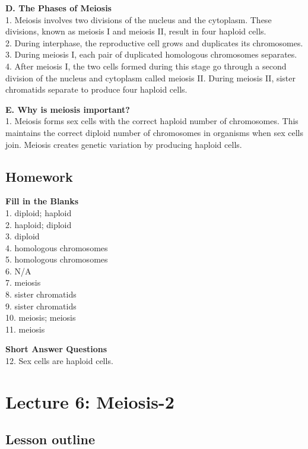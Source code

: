 \documentclass[
]{book}
\begin{document}
\textbf{D. The Phases of Meiosis}\\
1. Meiosis involves two divisions of the nucleus and the {cytoplasm}. These divisions, known as meiosis I and meiosis II, result in four haploid cells.\\
2. During {interphase}, the reproductive cell grows and duplicates its chromosomes.\\
3. During meiosis I, each pair of duplicated homologous chromosomes {separates}.\\
4. After meiosis I, the two cells formed during this stage go through a second division of the {nucleus} and cytoplasm called meiosis II. During meiosis II, sister {chromatids} separate to produce four haploid cells.

\textbf{E. Why is meiosis important?}\\
1. Meiosis forms sex cells with the correct haploid number of {chromosomes}. This maintains the correct {diploid} number of chromosomes in organisms when sex cells join. Meiosis creates genetic variation by producing {haploid} cells.

\hypertarget{homework-1}{%
\subsection{Homework}\label{homework-1}}

\textbf{Fill in the Blanks}\\
1. diploid; haploid\\
2. haploid; diploid\\
3. diploid\\
4. homologous chromosomes\\
5. homologous chromosomes\\
6. N/A\\
7. meiosis\\
8. sister chromatids\\
9. sister chromatids\\
10. meiosis; meiosis\\
11. meiosis

\textbf{Short Answer Questions}\\
12. Sex cells are haploid cells.

\hypertarget{lecture-6-meiosis-2}{%
\section{Lecture 6: Meiosis-2}\label{lecture-6-meiosis-2}}

\hypertarget{lesson-outline-2}{%
\subsection{Lesson outline}\label{lesson-outline-2}}
\end{document}
